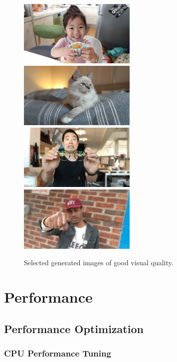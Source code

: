 \documentclass{article}
\begin{document}
\begin{figure}
        \includegraphics[width=0.5\textwidth]{../output/baby-portrait}
        \includegraphics[width=0.5\textwidth]{../output/cat-portrait}
        \includegraphics[width=0.5\textwidth]{../output/glasses-portrait}
        \includegraphics[width=0.5\textwidth]{../output/punch-portrait}
        \caption{Selected generated images of good visual quality.}
        \label{fig:good}
\end{figure}

\section{Performance}

\subsection{Performance Optimization}

\subsubsection{CPU Performance Tuning}
\end{document}

